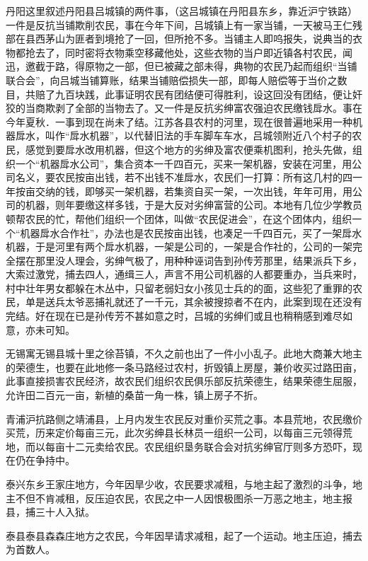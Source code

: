 丹阳这里叙述丹阳县吕城镇的两件事，（这吕城镇在丹阳县东乡，靠近沪宁铁路）一件是反抗当铺欺削农民，事在今年下间，吕城镇上有一家当铺，一天被马王仁残部在县西茅山为匪者到境抢了一回，但所抢不多。当铺主人即呜报失，说典当的衣物都抢去了，同时密将衣物乘空移藏他处，这些衣物的当户即近镇各村农民，闻迅，邀截于路，得原物之一部，但已被藏之部未得，典物的农民乃起而组织“当铺联合会”，向吕城当铺算账，结果当铺赔偿损失一部，即每人赔偿等于当价之数目，共赔了九百块践，此事证明农民有团结便可得胜利，设这回没有团结，便让奸狡的当商欺剥了全部的当物去了。又一件是反抗劣绅富农强迫农民缴钱戽水。事在今年夏秋．一事到现在尚未了结。江苏各县农村的河里，现在很普遍地采用一种机器戽水，叫作“戽水机器”，以代替旧法的手车脚车车水，吕城领附近八个村子的农民，感觉到要戽水改用机器，但这个地方的劣绅及富农便乘机图利，抢头先做，组织一个“机器戽水公司”，集合资本一千四百元，买来一架机器，安装在河里，用公司名义，要农民按亩出钱，若不出钱不准戽水，农民们一打算：所有这几村的四一年按亩交纳的钱，即够买一架机器，若集资自买一架，一次出钱，年年可用，用公司的机器，则年要缴这样多钱，于是大反对劣绅富营的公司。本地有几位少学教员顿帮农民的忙，帮他们组织一个团体，叫做“农民促进会”，在这个团体内，组织一个“机器戽水合作社”，办法也是农民按亩出钱，也凑足一千四百元，买了一架戽水机器，于是河里有两个戽水机器，一架是公司的，一架是合作社的，公司的一架完全摆在那里没人理会，劣绅气极了，用种种诬词告到孙传芳那里，结果派兵下乡，大索过激党，捕去四人，通缉三人，声言不用公司机器的人都要重办，当兵来时，村中壮年男女都躲在木丛中，只留老弱妇女小孩见士兵的的面，这些犯了重罪的农民，单是送兵太爷恶捕礼就还了一千元，其余被搜掠者不在内，此案到现在还没有完结。好在现在已是孙传芳不甚如意之时，吕城的劣绅们或且也稍稍感到难尽如意，亦未可知。

无锡寓无锡县城十里之徐苔镇，不久之前也出了一件小小乱子。此地大商兼大地主的荣德生，也要在此地修一条马路经过农村，折毁镇上房屋，兼价收买过路田亩，此事直接损害农民经济，故农民们组织农民俱乐部反抗荣德生，结果荣德生屈服，允许田二百元一亩，新植的桑苗一角一株，镇上房子不折。

青浦沪抗路侧之靖浦县，上月内发生农民反对重价买荒之事。本县荒地，农民缴价买荒，历来定价每亩三元，此次劣绅县长林员一组织一公司，以每亩三元领得荒地，而以每亩十二元卖给农民。农民组织垦务联合会对抗劣绅官厅则多方恐吓，现在仍在争持中。

泰兴东乡王家庄地方，今年因旱少收，农民要求减租，与地主起了激烈的斗争，地主不但不肯减租，反压迫农民，农民之中一人因恨极图杀一万恶之地主，地主报县，捕三十人入狱。

泰县泰县森森庄地方之农民，今年因旱请求减租，起了一个运动。地主压迫，捕去为首数人。

